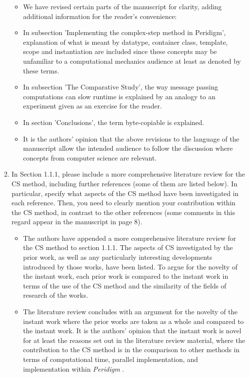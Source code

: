 \documentclass{article}
\begin{document}
\begin{enumerate}
{\color{red}
  \begin{itemize}
    \item 
        We have revised certain parts of the manuscript for clarity, adding additional information for the reader's
        convenience:
    \item
        In subsection 'Implementing the complex-step method in Peridigm', explanation of what is meant by datatype,
        container class, template, scope and instantiation are included since these concepts may be unfamiliar to
        a computational mechanics audience at least as denoted by these terms. 
    \item 
        In subsection 'The Comparative Study', the way message passing computations can slow runtime is explained
        by an analogy to an experiment given as an exercise for the reader. 
    \item 
        In section 'Conclusions', the term byte-copiable is explained. 
    \item 
        It is the authors' opinion that the above revisions to the language of the manuscript allow the intended audience
        to follow the discussion where concepts from computer science are relevant.
  \end{itemize}}

  \item
     In Section 1.1.1, please include a more comprehensive literature review for
     the CS method, including further references (some of them are listed below).
     In particular, specify what aspects of the CS method have been investigated in
     each reference. Then, you need to clearly mention your contribution within
     the CS method, in contrast to the other references (some comments in this
     regard appear in the manuscript in page 8).

{\color{red}
  \begin{itemize}
     \item 
         The authors have appended a more comprehensive literature review for the CS method to section 1.1.1.
         The aspects of CS investigated by the prior work, as well as any particularly interesting
         developments introduced by those works, have been listed. To argue for the novelty of the instant work,
         each prior work is compared to the instant work in terms of the use of the CS method and the similarity of the fields of research of the works.
     \item
         The literature review concludes with an argument for the novelty of the instant
         work where the prior works are taken as a whole and compared to the instant work. It is the authors' opinion
         that the instant work is novel for at least the reasons set out in the literature review material, where
         the contribution to the CS method is in the comparison to other methods in terms of computational
         time,  parallel implementation, and implementation within \emph{Peridigm} .
  \end{itemize}}



\end{enumerate}
\end{document}
